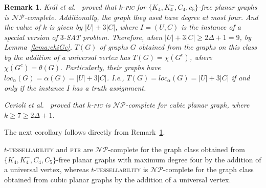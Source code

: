 \documentclass[9pt]{entcs} \usepackage{entcsmacro}
\newtheorem{rema}{Remark}[section]
\begin{document}



\begin{rema}
\label{rem:kral}
\emph{
Kr\'al et al.~\cite{ArKral} proved that \textsc{$k$-pic} for $\{K_4, K_4^-, C_4, c_5\}$-free planar graphs is $\mathcal{NP}$-complete.
Additionally, the graph they used have degree at most four.
And the value of $k$ is given by $|U|+3|C|$, where $I=(U, C)$ is the instance of a special version of \textsc{$3$-SAT} problem.
Therefore, when $|U|+3|C| \geq 2\Delta+1= 9$, by Lemma~\ref{lema:chiGc}, $T(G)$ of graphs $G$ obtained from the graphs on this class by the addition of a universal vertex has $T(G) = \chi(G^c)$, where $\chi(G^c) = \theta(G)$.
Particularly, their graphs have $loc_\alpha(G)=\alpha(G)=|U|+3|C|$.
I.e., $T(G) = loc_\alpha(G) = |U|+3|C|$ if and only if the instance $I$ has a truth assignment.}

\emph{Cerioli et al.~\cite{ArCerioli} proved that \textsc{$k$-pic} is $\mathcal{NP}$-complete for cubic planar graph, where $k \geq 7 \geq 2\Delta+1$.}

\end{rema}

The next corollary follows directly from Remark~\ref{rem:kral}.

\begin{cor}
\textsc{$t$-tessellability} and \textsc{ptr} are $\mathcal{NP}$-complete for the graph class obtained from $\{K_4, K_4^-, C_4, C_5\}$-free planar graphs with maximum degree four by the addition of a universal vertex, whereas \textsc{$t$-tessellability} is $\mathcal{NP}$-complete for the graph class obtained from cubic planar graphs by the addition of a universal vertex.
\end{cor}
\end{document}
